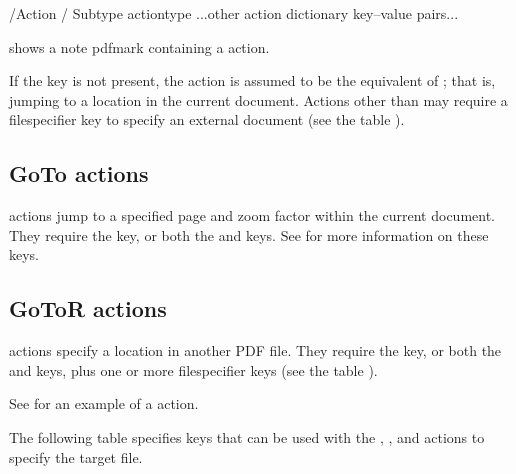 \documentclass[letterpaper,12pt,english,openany,oneside]{sphinxmanual}
\begin{document}
\begin{sphinxVerbatim}[commandchars=\\\{\}]
     /Action \PYGZlt{}\PYGZlt{} / Subtype
actiontype
        ...other action dictionary key–value pairs...
\PYGZgt{}\PYGZgt{}
\end{sphinxVerbatim}

 shows a note pdfmark containing a  action.

If the  key is not present, the action is assumed to be the equivalent of  ; that is, jumping to a location in the current document. Actions other than  may require a file\sphinxhyphen{}specifier key to specify an external document (see the table ).


\subsection{GoTo actions}
\label{\detokenize{pdfmark_Actions:goto-actions}}
 actions jump to a specified page and zoom factor within the current document. They require the  key, or both the  and  keys. See  for more information on these keys.


\subsection{GoToR actions}
\label{\detokenize{pdfmark_Actions:gotor-actions}}
 actions specify a location in another PDF file. They require the  key, or both the  and  keys, plus one or more file\sphinxhyphen{}specifier keys (see the table ).

See  for an example of a  action.

The following table specifies keys that can be used with the  ,  , and  actions to specify the target file.
\end{document}
